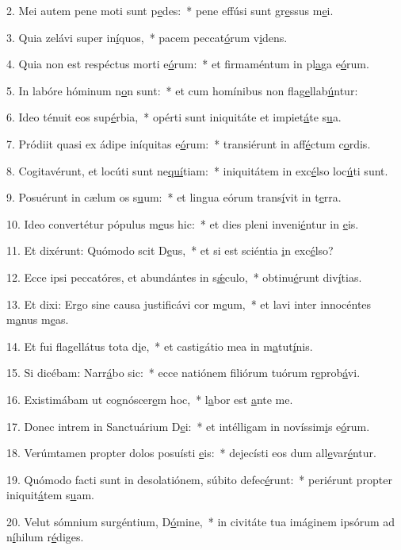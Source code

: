 2. Mei autem pene moti sunt p\uline{e}des:~* pene effúsi sunt gr\uline{e}ssus m\uline{e}i.\par 
3. Quia zelávi super in\uline{í}quos,~* pacem peccat\uline{ó}rum v\uline{i}dens.\par 
4. Quia non est respéctus morti e\uline{ó}rum:~* et firmaméntum in pl\uline{a}ga e\uline{ó}rum.\par 
5. In labóre hóminum n\uline{o}n sunt:~* et cum homínibus non flag\uline{e}llab\uline{ú}ntur:\par 
6. Ideo ténuit eos sup\uline{é}rbia,~* opérti sunt iniquitáte et impiet\uline{á}te s\uline{u}a.\par 
7. Pródiit quasi ex ádipe iníquitas e\uline{ó}rum:~* transiérunt in aff\uline{é}ctum c\uline{o}rdis.\par 
8. Cogitavérunt, et locúti sunt ne\uline{quí}tiam:~* iniquitátem in exc\uline{é}lso loc\uline{ú}ti sunt.\par 
9. Posuérunt in cælum os s\uline{u}um:~* et lingua eórum trans\uline{í}vit in t\uline{e}rra.\par 
10. Ideo convertétur pópulus m\uline{e}us hic:~* et dies pleni inveni\uline{é}ntur in \uline{e}is.\par 
11. Et dixérunt: Quómodo scit D\uline{e}us,~* et si est sciéntia \uline{i}n exc\uline{é}lso?\par 
12. Ecce ipsi peccatóres, et abundántes in s\uline{ǽ}culo,~* obtinu\uline{é}runt div\uline{í}tias.\par 
13. Et dixi: Ergo sine causa justificávi cor m\uline{e}um,~* et lavi inter innocéntes m\uline{a}nus m\uline{e}as.\par 
14. Et fui flagellátus tota d\uline{i}e,~* et castigátio mea in m\uline{a}tut\uline{í}nis.\par 
15. Si dicébam: Narr\uline{á}bo sic:~* ecce natiónem filiórum tuórum r\uline{e}prob\uline{á}vi.\par 
16. Existimábam ut cognóscer\uline{e}m hoc,~* l\uline{a}bor est \uline{a}nte me.\par 
17. Donec intrem in Sanctuárium D\uline{e}i:~* et intélligam in novíssim\uline{i}s e\uline{ó}rum.\par 
18. Verúmtamen propter dolos posuísti \uline{e}is:~* dejecísti eos dum all\uline{e}var\uline{é}ntur.\par 
19. Quómodo facti sunt in desolatiónem, súbito defec\uline{é}runt:~* periérunt propter iniquit\uline{á}tem s\uline{u}am.\par 
20. Velut sómnium surgéntium, D\uline{ó}mine,~* in civitáte tua imáginem ipsórum ad n\uline{í}hilum r\uline{é}diges.\par 
